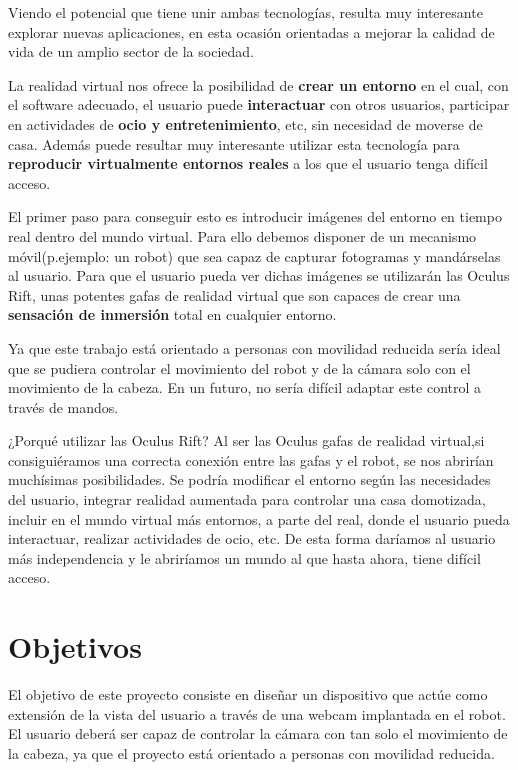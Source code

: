 \documentclass[twoside, 12pt]{epstfg}
\begin{document}
Viendo el potencial que tiene unir ambas tecnologías, resulta muy interesante explorar nuevas aplicaciones, en esta ocasión orientadas a mejorar la calidad de vida de un amplio sector de la sociedad.


La realidad virtual nos ofrece la posibilidad de \textbf{crear un entorno} en el cual, con el software adecuado, el usuario puede \textbf{interactuar} con otros usuarios, participar en actividades de \textbf{ocio y entretenimiento}, etc, sin necesidad de moverse de casa.
Además puede resultar muy interesante utilizar esta tecnología para \textbf{reproducir virtualmente entornos reales} a los que el usuario tenga difícil acceso.

El primer paso para conseguir esto es introducir imágenes del entorno en tiempo real dentro del mundo virtual. Para ello debemos disponer de un mecanismo móvil(p.ejemplo: un robot) que sea capaz de capturar fotogramas y mandárselas al usuario.  
Para que el usuario pueda ver dichas imágenes se utilizarán las Oculus Rift, unas potentes gafas de realidad virtual que son capaces de crear una \textbf{sensación de inmersión} total en cualquier entorno.

Ya que este trabajo está orientado a personas con movilidad reducida sería ideal que se pudiera controlar el movimiento del robot y de la cámara solo con el movimiento de la cabeza. En un futuro, no sería difícil adaptar este control a través de mandos.

¿Porqué utilizar las Oculus Rift?  Al ser las Oculus gafas de realidad virtual,si consiguiéramos una correcta conexión entre las gafas y el robot, se nos abrirían muchísimas posibilidades. Se podría modificar el entorno según las necesidades del usuario, integrar realidad aumentada para controlar una casa domotizada, incluir en el mundo virtual más entornos, a parte del real, donde el usuario pueda interactuar, realizar actividades de ocio, etc.
De esta forma daríamos al usuario más independencia y le abriríamos un mundo al que hasta ahora, tiene difícil acceso.

\section{Objetivos}
El objetivo de este proyecto consiste en diseñar un dispositivo que actúe como extensión de la vista del usuario a través de una webcam implantada en el robot. El usuario deberá ser capaz de controlar la cámara con tan solo el movimiento de la cabeza, ya que el proyecto está orientado a personas con movilidad reducida.
\end{document}
